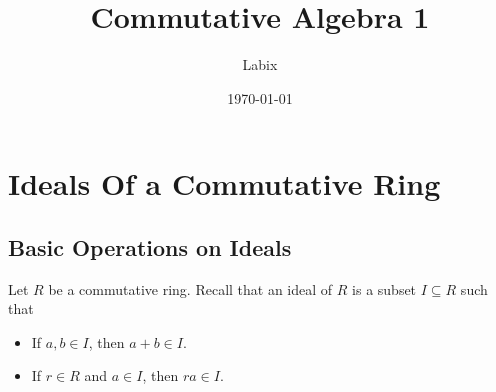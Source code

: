 \documentclass[a4paper]{article}
\title{Commutative Algebra 1}
\author{Labix}
\date{\today}
\begin{document}
\maketitle
\begin{abstract}
\end{abstract}
\pagebreak
\tableofcontents

\pagebreak
\section{Ideals Of a Commutative Ring}
\subsection{Basic Operations on Ideals}
Let $R$ be a commutative ring. Recall that an ideal of $R$ is a subset $I\subseteq R$ such that
\begin{itemize}
\item If $a,b\in I$, then $a+b\in I$. 
\item If $r\in R$ and $a\in I$, then $ra\in I$. 
\end{itemize}
\end{document}
